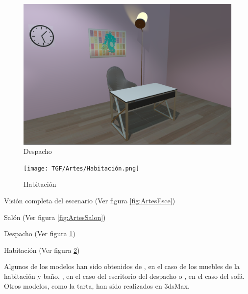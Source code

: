 \documentclass[12pt, a4paper,twoside,titlepage]{book}
\begin{document}
\begin{figure}
	\centering
	\includegraphics[width=.9\linewidth]{TGF/Artes/Despachito.png}
	\caption{Despacho}
	\label{fig:ArtesDesp}
\end{figure}

\begin{figure}
	\centering
	\texttt{[image: TGF/Artes/Habitación.png]}
	\caption{Habitación}
	\label{fig:ArtesHab}
\end{figure}


Visión completa del escenario (Ver figura \ref{fig:ArtesEsce})

Salón (Ver figura \ref{fig:ArtesSalon})

Despacho (Ver figura \ref{fig:ArtesDesp})

Habitación (Ver figura \ref{fig:ArtesHab})

Algunos de los modelos han sido obtenidos de \cite{refBedBath}, en el caso de los muebles de la habitación y baño, \cite{refDesk}, en el caso del escritorio del despacho o \cite{refSofa}, en el caso del sofá. Otros modelos, como la tarta, han sido realizados en 3dsMax. 
\end{document}
